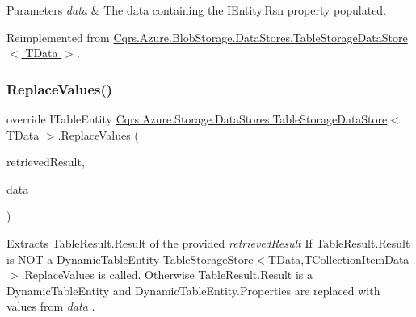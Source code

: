 \begin{DoxyParams}{Parameters}
{\em data} & The data containing the I\+Entity.\+Rsn property populated.\\
\hline
\end{DoxyParams}


Reimplemented from \hyperlink{classCqrs_1_1Azure_1_1BlobStorage_1_1DataStores_1_1TableStorageDataStore_aa4dc1bfeeb55483b68d8af3414000f7a_aa4dc1bfeeb55483b68d8af3414000f7a}{Cqrs.\+Azure.\+Blob\+Storage.\+Data\+Stores.\+Table\+Storage\+Data\+Store$<$ T\+Data $>$}.

\mbox{\label{classCqrs_1_1Azure_1_1Storage_1_1DataStores_1_1TableStorageDataStore_ae9aeb3daf2648a03db25f2a3ddfd87ee_ae9aeb3daf2648a03db25f2a3ddfd87ee}} 
\subsubsection{\texorpdfstring{Replace\+Values()}{ReplaceValues()}}
{\footnotesize\ttfamily override I\+Table\+Entity \hyperlink{classCqrs_1_1Azure_1_1Storage_1_1DataStores_1_1TableStorageDataStore}{Cqrs.\+Azure.\+Storage.\+Data\+Stores.\+Table\+Storage\+Data\+Store}$<$ T\+Data $>$.Replace\+Values (\begin{DoxyParamCaption}\item[{Table\+Result}]{retrieved\+Result,  }\item[{\hyperlink{classCqrs_1_1Azure_1_1BlobStorage_1_1EntityTableEntity}{Entity\+Table\+Entity}$<$ T\+Data $>$}]{data }\end{DoxyParamCaption})\hspace{0.3cm}{\ttfamily [protected]}}



Extracts Table\+Result.\+Result of the provided {\itshape retrieved\+Result}  If Table\+Result.\+Result is N\+OT a Dynamic\+Table\+Entity Table\+Storage\+Store$<$\+T\+Data,\+T\+Collection\+Item\+Data$>$.\+Replace\+Values is called. Otherwise Table\+Result.\+Result is a Dynamic\+Table\+Entity and Dynamic\+Table\+Entity.\+Properties are replaced with values from {\itshape data} . 


